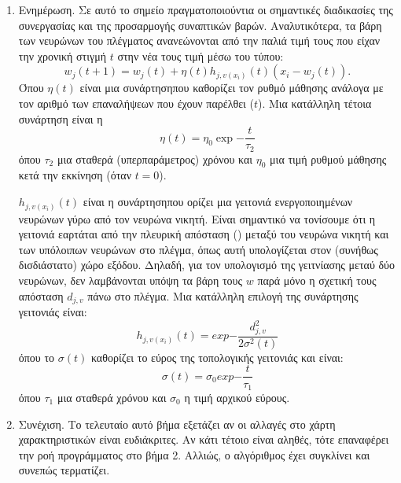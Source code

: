 \begin{enumerate}
  \item Ενημέρωση. Σε αυτό το σημείο πραγματοποιούντια οι σημαντικές διαδικασίες της συνεργασίας και της προσαρμογής συναπτικών βαρών. Αναλυτικότερα, τα βάρη των νευρώνων του πλέγματος ανανεώνονται από την παλιά τιμή τους που είχαν την χρονική στιγμή $t$ στην νέα τους τιμή μέσω του τύπου: 
  \begin{equation}
    w_j(t+1) = w_j(t) + \eta(t) h_{j,v(x_i)}(t)(x_i-w_j(t)).
  \end{equation}
  Όπου $\eta(t)$ είναι μια συνάρτηση που καθορίζει τον ρυθμό μάθησης ανάλογα με τον αριθμό των επαναλήψεων που έχουν παρέλθει ($t$). Μια κατάλληλη τέτοια συνάρτηση είναι η
  \begin{equation}
    \eta(t) = \eta_0 \exp{-\frac{t}{\tau_2}}
  \end{equation}
  όπου $\tau_2$ μια σταθερά (υπερπαράμετρος) χρόνου και $\eta_0$ μια τιμή ρυθμού μάθησης κετά την εκκίνηση (όταν $t=0$).
  
  $h_{j,v(x_i)}(t)$ είναι η συνάρτηση που ορίζει μια γειτονιά ενεργοποιημένων νευρώνων γύρω από τον νευρώνα νικητή. Είναι σημαντικό να τονίσουμε ότι η γειτονιά εαρτάται από την πλευρική απόσταση  () μεταξύ του νευρώνα νικητή και των υπόλοιπων νευρώνων στο πλέγμα, όπως αυτή υπολογίζεται στον (συνήθως δισδιάστατο) χώρο εξόδου. Δηλαδή, για τον υπολογισμό της γειτνίασης μεταύ δύο νευρώνων, δεν λαμβάνονται υπόψη τα βάρη τους $w$ παρά μόνο η σχετική τους απόσταση $d_{j,v}$ πάνω στο πλέγμα. Μια κατάλληλη επιλογή της συνάρτησης γειτονιάς είναι:
  \begin{equation}
    h_{j,v(x_i)}(t) = exp{-\frac{d^2_{j,v}}{2\sigma^2(t)}}
  \end{equation}
  όπου το $\sigma(t)$ καθορίζει το εύρος της τοπολογικής γειτονιάς και είναι:
  \begin{equation}
    \sigma(t) = \sigma_0 exp{-\frac{t}{\tau_1}}
  \end{equation}
  όπου $\tau_1$ μια σταθερά χρόνου και $\sigma_0$ η τιμή αρχικού εύρους.

  \item Συνέχιση. Το τελευταίο αυτό βήμα εξετάζει αν οι αλλαγές στο χάρτη χαρακτηριστικών είναι ευδιάκριτες. Αν κάτι τέτοιο είναι αληθές, τότε επαναφέρει την ροή προγράμματος στο βήμα 2. Αλλιώς, ο αλγόριθμος έχει συγκλίνει και συνεπώς τερματίζει.
\end{enumerate}

